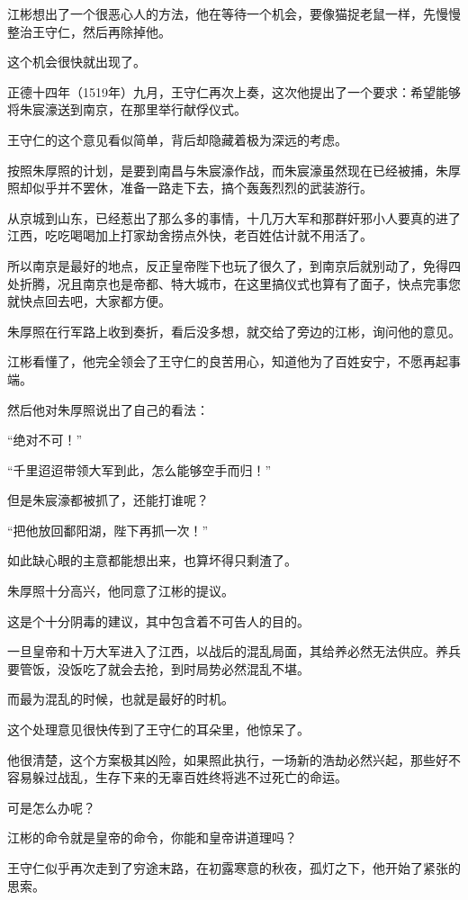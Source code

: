 \begin{multicols}{\theparacolNo}
		江彬想出了一个很恶心人的方法，他在等待一个机会，要像猫捉老鼠一样，先慢慢整治王守仁，然后再除掉他。

		这个机会很快就出现了。

		正德十四年（1519年）九月，王守仁再次上奏，这次他提出了一个要求：希望能够将朱宸濠送到南京，在那里举行献俘仪式。

		王守仁的这个意见看似简单，背后却隐藏着极为深远的考虑。

		按照朱厚照的计划，是要到南昌与朱宸濠作战，而朱宸濠虽然现在已经被捕，朱厚照却似乎并不罢休，准备一路走下去，搞个轰轰烈烈的武装游行。

		从京城到山东，已经惹出了那么多的事情，十几万大军和那群奸邪小人要真的进了江西，吃吃喝喝加上打家劫舍捞点外快，老百姓估计就不用活了。

		所以南京是最好的地点，反正皇帝陛下也玩了很久了，到南京后就别动了，免得四处折腾，况且南京也是帝都、特大城市，在这里搞仪式也算有了面子，快点完事您就快点回去吧，大家都方便。

		朱厚照在行军路上收到奏折，看后没多想，就交给了旁边的江彬，询问他的意见。

		江彬看懂了，他完全领会了王守仁的良苦用心，知道他为了百姓安宁，不愿再起事端。

		然后他对朱厚照说出了自己的看法：

		“绝对不可！”

		“千里迢迢带领大军到此，怎么能够空手而归！”

		但是朱宸濠都被抓了，还能打谁呢？

		“把他放回鄱阳湖，陛下再抓一次！”

		如此缺心眼的主意都能想出来，也算坏得只剩渣了。

		朱厚照十分高兴，他同意了江彬的提议。

		这是个十分阴毒的建议，其中包含着不可告人的目的。

		一旦皇帝和十万大军进入了江西，以战后的混乱局面，其给养必然无法供应。养兵要管饭，没饭吃了就会去抢，到时局势必然混乱不堪。

		而最为混乱的时候，也就是最好的时机。

		这个处理意见很快传到了王守仁的耳朵里，他惊呆了。

		他很清楚，这个方案极其凶险，如果照此执行，一场新的浩劫必然兴起，那些好不容易躲过战乱，生存下来的无辜百姓终将逃不过死亡的命运。

		可是怎么办呢？

		江彬的命令就是皇帝的命令，你能和皇帝讲道理吗？

		王守仁似乎再次走到了穷途末路，在初露寒意的秋夜，孤灯之下，他开始了紧张的思索。


\end{multicols}
